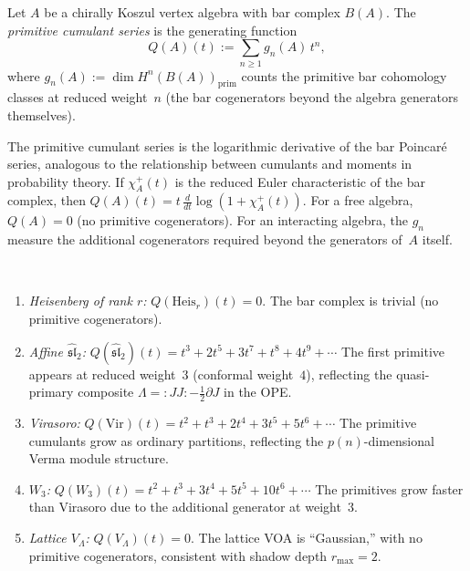 \begin{definition}
Let $A$ be a chirally Koszul vertex algebra with bar complex $B(A)$.
The \emph{primitive cumulant series} is the generating function
\begin{equation}%
Q(A)(t) := \sum_{n \ge 1} g_n(A)\, t^n,
\end{equation}
where $g_n(A) := \dim H^n(B(A))_{\mathrm{prim}}$ counts the primitive
bar cohomology classes at reduced weight~$n$
(the bar cogenerators beyond the algebra generators themselves).
\end{definition}

\begin{remark}
The primitive cumulant series is the logarithmic derivative of the
bar Poincar\'e series, analogous to the relationship between cumulants
and moments in probability theory. If $\chi_A^+(t)$ is the reduced
Euler characteristic of the bar complex, then
$Q(A)(t) = t\,\frac{d}{dt}\log(1 + \chi_A^+(t))$.
For a free algebra, $Q(A) = 0$ (no primitive cogenerators).
For an interacting algebra, the $g_n$ measure the additional
cogenerators required beyond the generators of~$A$ itself.
\end{remark}

\begin{computation}
\ \\[-1em]
\begin{enumerate}[leftmargin=2.4em]
\item \emph{Heisenberg of rank $r$:}
$Q(\mathrm{Heis}_r)(t) = 0$.
The bar complex is trivial (no primitive cogenerators).

\item \emph{Affine $\widehat{\mathfrak{sl}}_2$:}
$Q(\widehat{\mathfrak{sl}}_2)(t) = t^3 + 2t^5 + 3t^7 + t^8 + 4t^9 + \cdots$
The first primitive appears at reduced weight~$3$ (conformal weight~$4$),
reflecting the quasi-primary composite $\Lambda = {:}JJ{:} -
\frac{1}{2}\partial J$ in the OPE.

\item \emph{Virasoro:}
$Q(\mathrm{Vir})(t) = t^2 + t^3 + 2t^4 + 3t^5 + 5t^6 + \cdots$
The primitive cumulants grow as ordinary partitions, reflecting the
$p(n)$-dimensional Verma module structure.

\item \emph{$W_3$:}
$Q(W_3)(t) = t^2 + t^3 + 3t^4 + 5t^5 + 10t^6 + \cdots$
The primitives grow faster than Virasoro due to the additional
generator at weight~$3$.

\item \emph{Lattice $V_\Lambda$:}
$Q(V_\Lambda)(t) = 0$.
The lattice VOA is ``Gaussian,'' with no primitive cogenerators,
consistent with shadow depth $r_{\max} = 2$.
\end{enumerate}
\end{computation}

